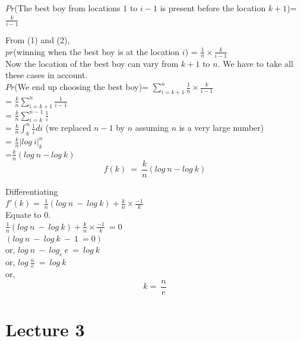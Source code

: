 \documentclass[a4paper]{article}
\begin{document}
$Pr$(The best boy from locations $1$ to $i-1$ is present before the location $k+1$)= $\frac{k}{i-1}$

From (1) and (2), \\
$pr$(winning when the best boy is at the location $i$) = $\frac{1}{n} \times \frac{k}{i-1}$\\

Now the location of the best boy can vary from $k+1$ to $n$. We have to take all these cases in account. \\

$Pr$(We end up choosing the best boy)= $\sum_{i=k+1}^n \frac{1}{n} \times \frac{k}{i-1}$\\

= $\frac{k}{n} \sum_{i=k+1}^n \frac{1}{i-1}$\\

= $\frac{k}{n} \sum_{i=k}^{n-1} \frac{1}{i}$\\

= $\frac{k}{n} \int_{k}^{n} \frac{1}{i} di$ (we replaced $n-1$ by $n$ assuming $n$ is a very large number)\\

= $\frac{k}{n}|log\ i|_{k}^{n}$\\

=$\frac{k}{n} (log\ n - log\ k)$\\

\[
 \boxed{f(k)\ =\ \frac{k}{n} (log\ n - log\ k)}
 \]
 
 Differentiating \\
 
 $f'(k)=\ \frac{1}{n} (log\ n\ -\ log\ k) + \frac{k}{n} \times \frac{-1}{k}$\\
 
 Equate to $0$. \\
 
 $\frac{1}{n} (log\ n\ -\ log\ k) + \frac{k}{n} \times \frac{-1}{k}\ =0$\\
 
 $ (log\ n\ -\ log\ k\ -\ 1\ = 0)$\\
 
 or, $log\ n\ -\ log_e\ e\ =\ log\ k$\\
 
 or, $log\ \frac{n}{e}\ =\ log\ k$\\
 
 or, 
\[
 \boxed{k=\ \frac{n}{e}}
 \]


\section{Lecture 3}
\end{document}
